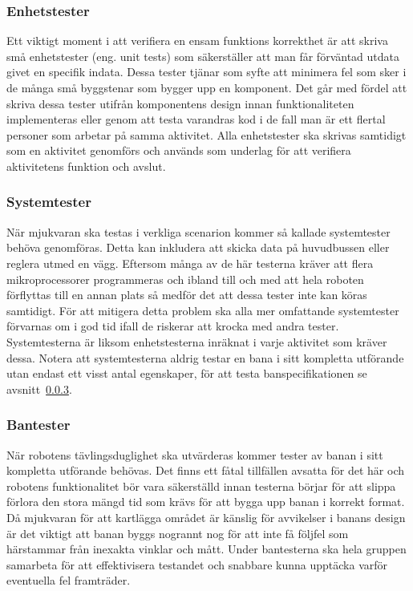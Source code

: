 \documentclass{article}
\begin{document}
\subsubsection{Enhetstester}
Ett viktigt moment i att verifiera en ensam funktions korrekthet är att skriva små enhetstester (eng. unit tests) som säkerställer att man får förväntad utdata givet en specifik indata. Dessa tester tjänar som syfte att minimera fel som sker i de många små byggstenar som bygger upp en komponent. Det går med fördel att skriva dessa tester utifrån komponentens design innan funktionaliteten implementeras eller genom att testa varandras kod i de fall man är ett flertal personer som arbetar på samma aktivitet. Alla enhetstester ska skrivas samtidigt som en aktivitet genomförs och används som underlag för att verifiera aktivitetens funktion och avslut.

\subsubsection{Systemtester}
När mjukvaran ska testas i verkliga scenarion kommer så kallade systemtester behöva genomföras. Detta kan inkludera att skicka data på huvudbussen eller reglera utmed en vägg. Eftersom många av de här testerna kräver att flera mikroprocessorer programmeras och ibland till och med att hela roboten förflyttas till en annan plats så medför det att dessa tester inte kan köras samtidigt. För att mitigera detta problem ska alla mer omfattande systemtester förvarnas om i god tid ifall de riskerar att krocka med andra tester. Systemtesterna är liksom enhetstesterna inräknat i varje aktivitet som kräver dessa. Notera att systemtesterna aldrig testar en bana i sitt kompletta utförande utan endast ett visst antal egenskaper, för att testa banspecifikationen se avsnitt~\ref{sec:bantester}.

\subsubsection{Bantester}
\label{sec:bantester}
När robotens tävlingsduglighet ska utvärderas kommer tester av banan i sitt kompletta utförande behövas. Det finns ett fåtal tillfällen avsatta för det här och robotens funktionalitet bör vara säkerställd innan testerna börjar för att slippa förlora den stora mängd tid som krävs för att bygga upp banan i korrekt format. Då mjukvaran för att kartlägga området är känslig för avvikelser i banans design är det viktigt att banan byggs nogrannt nog för att inte få följfel som härstammar från inexakta vinklar och mått. Under bantesterna ska hela gruppen samarbeta för att effektivisera testandet och snabbare kunna upptäcka varför eventuella fel framträder.
\end{document}
